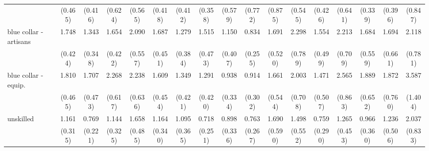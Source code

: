 {\begin{tabular}{l*{16}{c}}
                    &     (0.465)         &     (0.416)         &     (0.624)         &     (0.565)         &     (0.418)         &     (0.412)         &     (0.358)         &     (0.579)         &     (0.772)         &     (0.875)         &     (0.545)         &     (0.426)         &     (0.641)         &     (0.339)         &     (0.396)         &     (0.847)         \\
[1em]
blue collar - artisans&       1.748\sym{*}  &       1.343         &       1.654\sym{*}  &       2.090\sym{**} &       1.687         &       1.279         &       1.515         &       1.150         &       0.834         &       1.691         &       2.298\sym{*}  &       1.554         &       2.213\sym{*}  &       1.684         &       1.694         &       2.118\sym{*}  \\
                    &     (0.424)         &     (0.348)         &     (0.422)         &     (0.557)         &     (0.451)         &     (0.384)         &     (0.473)         &     (0.407)         &     (0.255)         &     (0.520)         &     (0.789)         &     (0.499)         &     (0.709)         &     (0.559)         &     (0.661)         &     (0.781)         \\
[1em]
blue collar - equip.&       1.810\sym{*}  &       1.707         &       2.268\sym{**} &       2.238\sym{**} &       1.609         &       1.349         &       1.291         &       0.938         &       0.914         &       1.661         &       2.003\sym{*}  &       1.471         &       2.565\sym{**} &       1.889         &       1.872         &       3.587\sym{**} \\
                    &     (0.465)         &     (0.473)         &     (0.617)         &     (0.636)         &     (0.454)         &     (0.421)         &     (0.420)         &     (0.334)         &     (0.302)         &     (0.544)         &     (0.708)         &     (0.507)         &     (0.863)         &     (0.652)         &     (0.760)         &     (1.404)         \\
[1em]
unskilled           &       1.161         &       0.769         &       1.144         &       1.658         &       1.164         &       1.095         &       0.718         &       0.898         &       0.763         &       1.690         &       1.498         &       0.759         &       1.265         &       0.966         &       1.236         &       2.037         \\
                    &     (0.315)         &     (0.221)         &     (0.325)         &     (0.485)         &     (0.340)         &     (0.365)         &     (0.251)         &     (0.336)         &     (0.267)         &     (0.590)         &     (0.552)         &     (0.290)         &     (0.453)         &     (0.360)         &     (0.506)         &     (0.833)         \\

\end{tabular}}
